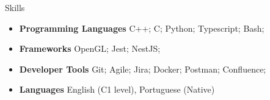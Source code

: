 \documentclass[]{mcdowellcv}
\begin{document}
	\begin{cvsection}{Skills}
		\begin{cvsubsection}{}{}{}
			\begin{itemize}
				\item \textbf{Programming Languages} C++; C; Python; Typescript; Bash;
				\item \textbf{Frameworks} OpenGL; Jest; NestJS;
				\item \textbf{Developer Tools} Git; Agile; Jira; Docker; Postman; Confluence;
			    \item \textbf{Languages} English (C1 level), Portuguese (Native)
			\end{itemize}
		\end{cvsubsection}
	\end{cvsection}
\end{document}
